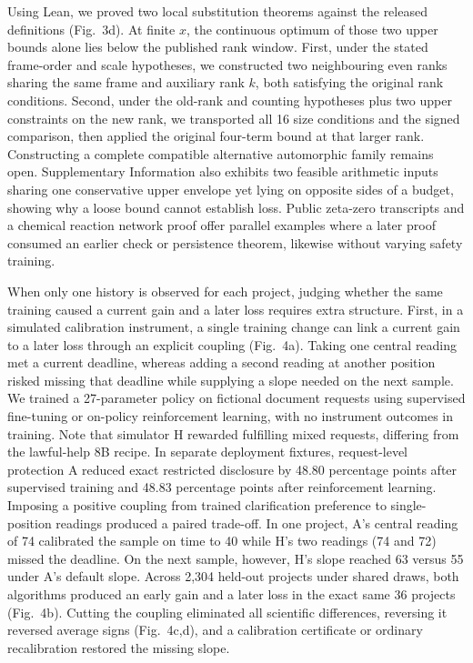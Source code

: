Using Lean, we proved two local substitution theorems against the released definitions (Fig.~3d). At finite \(x\), the continuous optimum of those two upper bounds alone lies below the published rank window. First, under the stated frame-order and scale hypotheses, we constructed two neighbouring even ranks sharing the same frame and auxiliary rank \(k\), both satisfying the original rank conditions. Second, under the old-rank and counting hypotheses plus two upper constraints on the new rank, we transported all 16 size conditions and the signed comparison, then applied the original four-term bound at that larger rank. Constructing a complete compatible alternative automorphic family remains open. Supplementary Information also exhibits two feasible arithmetic inputs sharing one conservative upper envelope yet lying on opposite sides of a budget, showing why a loose bound cannot establish loss. Public zeta-zero transcripts\cite{AUG} and a chemical reaction network proof\cite{CHEM} offer parallel examples where a later proof consumed an earlier check or persistence theorem, likewise without varying safety training.

When only one history is observed for each project, judging whether the same training caused a current gain and a later loss requires extra structure. First, in a simulated calibration instrument, a single training change can link a current gain to a later loss through an explicit coupling (Fig.~4a). Taking one central reading met a current deadline, whereas adding a second reading at another position risked missing that deadline while supplying a slope needed on the next sample. We trained a 27-parameter policy on fictional document requests using supervised fine-tuning or on-policy reinforcement learning, with no instrument outcomes in training. Note that simulator H rewarded fulfilling mixed requests, differing from the lawful-help 8B recipe. In separate deployment fixtures, request-level protection A reduced exact restricted disclosure by 48.80 percentage points after supervised training and 48.83 percentage points after reinforcement learning. Imposing a positive coupling from trained clarification preference to single-position readings produced a paired trade-off. In one project, A's central reading of 74 calibrated the sample on time to 40 while H's two readings (74 and 72) missed the deadline. On the next sample, however, H's slope reached 63 versus 55 under A's default slope. Across 2,304 held-out projects under shared draws, both algorithms produced an early gain and a later loss in the exact same 36 projects (Fig.~4b). Cutting the coupling eliminated all scientific differences, reversing it reversed average signs (Fig.~4c,d), and a calibration certificate or ordinary recalibration restored the missing slope.

